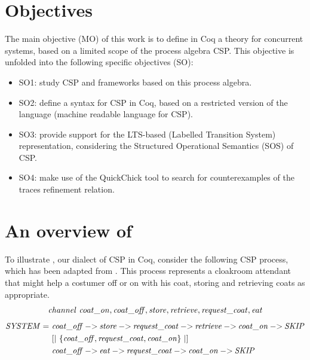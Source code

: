 \section{Objectives}

The main objective (MO) of this work is to define in Coq a theory for concurrent systems, based on a limited scope of the process algebra CSP. This objective is unfolded into the following specific objectives (SO):

\begin{itemize}
	\item SO1: study CSP and frameworks based on this process algebra.
	\item SO2: define a syntax for CSP in Coq, based on a restricted version of the \CSPM{} language (machine readable language for CSP).
	\item SO3: provide support for the LTS-based (Labelled Transition System) representation, considering the Structured Operational Semantics (SOS) of CSP.
	\item SO4: make use of the QuickChick tool to search for counterexamples of the traces refinement relation.
\end{itemize}

\section{An overview of \CSPcoq{}}

To illustrate \CSPcoq{}, our dialect of CSP in Coq, consider the following CSP process, which has been adapted from . This process represents a cloakroom attendant that might help a costumer off or on with his coat, storing and retrieving coats as appropriate.
%
\begin{align}
	\mathit{channel\ coat\_on, coat\_off, store, retrieve, request\_coat, eat}\notag
\end{align}
\begin{align}
	\mathit{SYSTEM} =\ &\mathit{coat\_off \mathbin{{-}{>}} store \mathbin{{-}{>}} request\_coat \mathbin{{-}{>}} retrieve \mathbin{{-}{>}} coat\_on \mathbin{{-}{>}} SKIP}\notag\\
			 &[|\ \{\mathit{coat\_off, request\_coat, coat\_on}\}\ |]\notag\\
	  		 &\mathit{coat\_off \mathbin{{-}{>}} eat \mathbin{{-}{>}} request\_coat \mathbin{{-}{>}} coat\_on \mathbin{{-}{>}} SKIP}\notag
\end{align}


